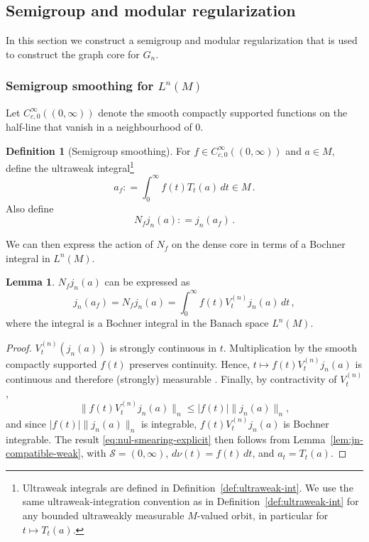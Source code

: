 \documentclass[11pt,a4paper]{article}
\theoremstyle{plain}
\numberwithin{theorem}{section}
\theoremstyle{definition}
\newtheorem{definition}[theorem]{Definition}
\newtheorem{lemma}[theorem]{Lemma}
\newcommand{\?}{\overset{?}{=}}
\newcommand{\defeq}{\mathrel{\mathop:}=}
\newcommand{\I}{\infty}
\begin{document}
\subsection{Semigroup and modular regularization}\label{subsec:modular-semigroup-reg}
In this section we construct a semigroup and modular regularization that is used to construct the graph core for $G_n$.

\subsubsection{Semigroup smoothing for \texorpdfstring{$L^n(M)$}{LnM}}
\label{subsec:null-smoothing}

Let $C_{c,0}^\infty((0,\infty))$ denote the smooth compactly supported functions on the half-line that vanish in a neighbourhood of $0$.  
\begin{definition}[Semigroup smoothing]
    For $f\in C_{c,0}^\infty((0,\infty))$ and $a\in M$, define the ultraweak integral\footnote{Ultraweak integrals are defined in Definition~\ref{def:ultraweak-int}. We use the same ultraweak-integration convention as in Definition~\ref{def:ultraweak-int} for any bounded ultraweakly measurable $M$-valued orbit, in particular for $t\mapsto T_t(a)$.}
\begin{equation}\label{eq:def-null-smearing}
  a_f\defeq \int_0^\infty f(t)T_t(a)\,dt\in M\,.
\end{equation}
Also define
\begin{equation}\label{eq:def-null-smearing-operator}
  N_fj_n(a)\defeq j_n(a_f)\,.
\end{equation}
\end{definition}

We can then express the action of $N_f$ on the dense core in terms of a Bochner integral in $L^n(M)$.
\begin{lemma}\label{lem:Nf-action}
$N_fj_n(a)$ can be expressed as
\begin{equation}\label{eq:nul-smearing-explicit}
  j_n(a_f) = N_fj_n(a)=\int_0^\infty f(t)V_t^{(n)}j_n(a)\,dt\,,
\end{equation}
where the integral is a Bochner integral in the Banach space $L^n(M)$.
\end{lemma}
\begin{proof}
$V_t^{(n)}(j_n(a))$ is strongly continuous in $t$. Multiplication by the smooth compactly supported $f(t)$ preserves continuity. Hence, $t\mapsto f(t)V_t^{(n)}j_n(a)$ is continuous and therefore (strongly) measurable \cite[Corollary 1.1.2]{arendt.batty.ea:11:vector-valued}.  Finally, by contractivity of $V_t^{(n)}$, $$\|f(t)V_t^{(n)} j_n(a)\|_n \leq |f(t)|\|j_n(a)\|_n,$$
and since $|f(t)|\|j_n(a)\|_n$ is integrable, $f(t)V_t^{(n)}j_n(a)$ is Bochner integrable.  
The result \eqref{eq:nul-smearing-explicit} then follows from Lemma~\ref{lem:jn-compatible-weak}, with $\mathcal S= (0,\I)$, $d\nu(t)=f(t)\,dt$, and $a_t=T_t(a)$.
\end{proof}
\end{document}
